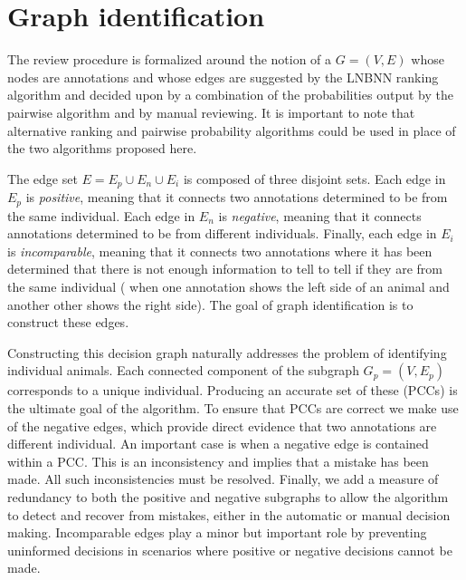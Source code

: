 \chapter{Graph identification}\label{chap:graphid}


The review procedure is formalized around the notion of a %
 $G = (V, E)$ whose nodes are annotations and whose
  edges are suggested by the LNBNN ranking algorithm and decided upon by a
  combination of the probabilities output by the pairwise algorithm and by
  manual reviewing.
It is important to note that alternative ranking and pairwise probability
  algorithms could be used in place of the two algorithms proposed here.


The edge set $E = E_p \cup E_n \cup E_i$ is composed of three disjoint sets.
Each edge in $E_p$ is \emph{positive}, meaning that it connects two
  annotations determined to be from the same individual.
Each edge in $E_n$ is \emph{negative}, meaning that it connects annotations
  determined to be from different individuals.
Finally, each edge in $E_i$ is \emph{incomparable}, meaning that it connects
  two annotations where it has been determined that there is not enough
  information to tell to tell if they are from the same individual (\eg{} when
  one annotation shows the left side of an animal and another other shows the
  right side).
The goal of graph identification is to construct these edges.
  

Constructing this decision graph naturally addresses the problem of
  identifying individual animals.
Each connected component of the subgraph $G_p = (V, E_p)$ corresponds to a
  unique individual.
Producing an accurate set of these 
  (PCCs) is the ultimate goal of the algorithm.
To ensure that PCCs are correct we make use of the negative edges, which
  provide direct evidence that two annotations are different individual.
An important case is when a negative edge is contained within a PCC.
This is an inconsistency and implies that a mistake has been made.
All such inconsistencies must be resolved.
Finally, we add a measure of redundancy to both the positive and negative
  subgraphs to allow the algorithm to detect and recover from mistakes, either
  in the automatic or manual decision making.
Incomparable edges play a minor but important role by preventing uninformed
  decisions in scenarios where positive or negative decisions cannot be made.


